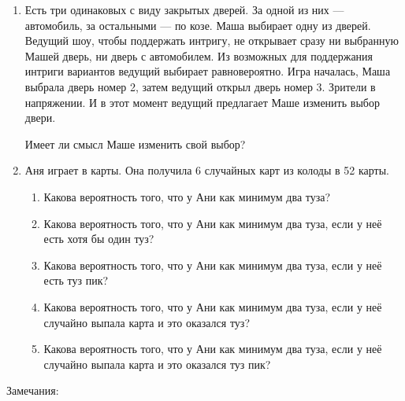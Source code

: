 \documentclass[12pt]{article}
\theoremstyle{definition}
\begin{document}
{\begin{enumerate}
\begin{enumerate}
  \item Какова вероятность того, что все бояре берут мзду, если случайно выбранный боярин берёт мзду?
  \item Какова вероятность того, что все бояре берут мзду, если хотя бы один из бояр берёт мзду?
\end{enumerate}
\item Есть три одинаковых с виду закрытых дверей. За одной из них — автомобиль, за остальными — по козе.
Маша выбирает одну из дверей.
Ведущий шоу, чтобы поддержать интригу, не открывает сразу ни выбранную Машей дверь,
ни дверь с автомобилем. 
Из возможных для поддержания интриги вариантов ведущий выбирает равновероятно.
Игра началась, Маша выбрала дверь номер 2, затем ведущий открыл дверь номер 3. 
Зрители в напряжении. 
И в этот момент ведущий предлагает Маше изменить выбор двери.

Имеет ли смысл Маше изменить свой выбор?


\item Аня играет в карты. Она получила 6 случайных карт из колоды в 52 карты.
\begin{enumerate}
 \item Какова вероятность того, что у Ани как минимум два туза?
 \item Какова вероятность того, что у Ани как минимум два туза, если у неё есть хотя бы один туз?
 \item Какова вероятность того, что у Ани как минимум два туза, если у неё есть туз пик?
 \item Какова вероятность того, что у Ани как минимум два туза, если у неё случайно выпала карта и это оказался туз?
 \item Какова вероятность того, что у Ани как минимум два туза, если у неё случайно выпала карта и это оказался туз пик?
\end{enumerate}
\end{enumerate}


}




\newpage
\thispagestyle{empty}
\dayone
\newpage
\thispagestyle{empty}



\dayone

\newpage
\thispagestyle{empty}
\partB
\newpage
\thispagestyle{empty}
\partB




Замечания:
\end{document}
